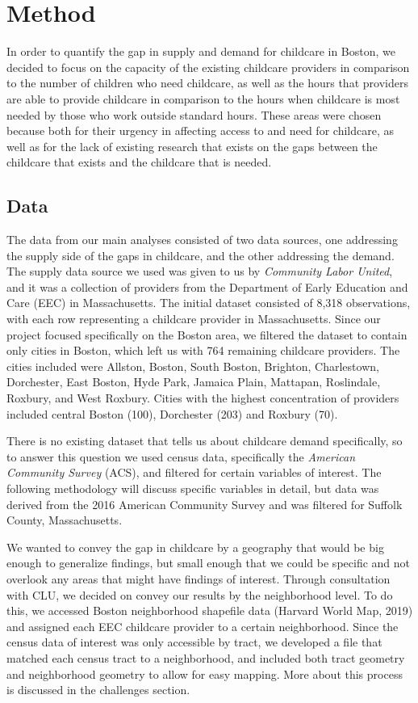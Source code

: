 \documentclass[10pt,letterpaper]{article}
\begin{document}
\section{Method}\label{method}

In order to quantify the gap in supply and demand for childcare in
Boston, we decided to focus on the capacity of the existing childcare
providers in comparison to the number of children who need childcare, as
well as the hours that providers are able to provide childcare in
comparison to the hours when childcare is most needed by those who work
outside standard hours. These areas were chosen because both for their
urgency in affecting access to and need for childcare, as well as for
the lack of existing research that exists on the gaps between the
childcare that exists and the childcare that is needed.

\subsection{Data}\label{data}

The data from our main analyses consisted of two data sources, one
addressing the supply side of the gaps in childcare, and the other
addressing the demand. The supply data source we used was given to us by
\emph{Community Labor United}, and it was a collection of providers from
the Department of Early Education and Care (EEC) in Massachusetts. The
initial dataset consisted of 8,318 observations, with each row
representing a childcare provider in Massachusetts. Since our project
focused specifically on the Boston area, we filtered the dataset to
contain only cities in Boston, which left us with 764 remaining
childcare providers. The cities included were Allston, Boston, South
Boston, Brighton, Charlestown, Dorchester, East Boston, Hyde Park,
Jamaica Plain, Mattapan, Roslindale, Roxbury, and West Roxbury. Cities
with the highest concentration of providers included central Boston
(100), Dorchester (203) and Roxbury (70).

There is no existing dataset that tells us about childcare demand
specifically, so to answer this question we used census data,
specifically the \emph{American Community Survey} (ACS), and filtered
for certain variables of interest. The following methodology will
discuss specific variables in detail, but data was derived from the 2016
American Community Survey and was filtered for Suffolk County,
Massachusetts.

We wanted to convey the gap in childcare by a geography that would be
big enough to generalize findings, but small enough that we could be
specific and not overlook any areas that might have findings of
interest. Through consultation with CLU, we decided on convey our
results by the neighborhood level. To do this, we accessed Boston
neighborhood shapefile data (Harvard World Map, 2019) and assigned each
EEC childcare provider to a certain neighborhood. Since the census data
of interest was only accessible by tract, we developed a file that
matched each census tract to a neighborhood, and included both tract
geometry and neighborhood geometry to allow for easy mapping. More about
this process is discussed in the challenges section.
\end{document}
